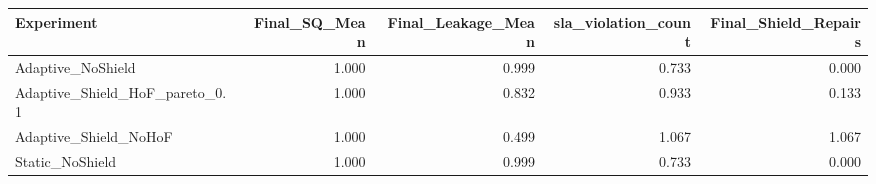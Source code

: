 \begin{tabular}{lrrrr}
\toprule
Experiment & Final_SQ_Mean & Final_Leakage_Mean & sla_violation_count & Final_Shield_Repairs \\
\midrule
Adaptive_NoShield & 1.000 & 0.999 & 0.733 & 0.000 \\
Adaptive_Shield_HoF_pareto_0.1 & 1.000 & 0.832 & 0.933 & 0.133 \\
Adaptive_Shield_NoHoF & 1.000 & 0.499 & 1.067 & 1.067 \\
Static_NoShield & 1.000 & 0.999 & 0.733 & 0.000 \\
\bottomrule
\end{tabular}

